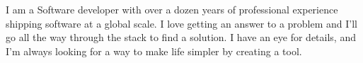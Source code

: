 

\begin{cvparagraph}

I am a Software developer with over a dozen years of professional experience shipping software at a global scale. 
I love getting an answer to a problem and I'll go all the way through the stack to find a solution. 
I have an eye for details, and I'm always looking for a way to make life simpler by creating a tool.
\end{cvparagraph}
